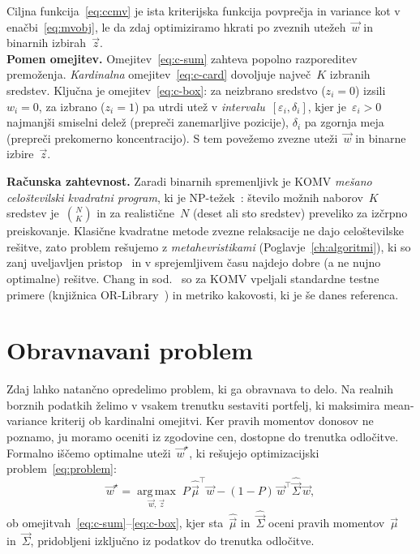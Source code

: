 \noindent Ciljna funkcija~\eqref{eq:ccmv} je ista kriterijska funkcija povprečja in variance kot v enačbi~\eqref{eq:mvobj}, le da zdaj optimiziramo hkrati po zveznih utežeh~$\vec{w}$ in binarnih izbirah~$\vec{z}$.\\

\noindent\textbf{Pomen omejitev.} Omejitev~\eqref{eq:c-sum} zahteva popolno razporeditev premoženja. \emph{Kardinalna} omejitev~\eqref{eq:c-card} dovoljuje največ~$K$ izbranih sredstev. Ključna je omejitev~\eqref{eq:c-box}: za neizbrano sredstvo ($z_i=0$) izsili~$w_i=0$, za izbrano ($z_i=1$) pa utrdi utež v \emph{intervalu}~$[\varepsilon_i,\delta_i]$, kjer je~$\varepsilon_i>0$ najmanjši smiselni delež (prepreči zanemarljive pozicije), $\delta_i$ pa zgornja meja (prepreči prekomerno koncentracijo). S tem povežemo zvezne uteži~$\vec{w}$ in binarne izbire~$\vec{z}$.

\noindent\textbf{Računska zahtevnost.} Zaradi binarnih spremenljivk je KOMV \emph{mešano celoštevilski kvadratni program}, ki je NP-težek~\cite{chang2000}: število možnih naborov~$K$ sredstev je~$\binom{N}{K}$ in za realistične~$N$ (deset ali sto sredstev) preveliko za izčrpno preiskovanje. Klasične kvadratne metode zvezne relaksacije ne dajo celoštevilske rešitve, zato problem rešujemo z \emph{metahevristikami} (Poglavje~\ref{ch:algoritmi}), ki so zanj uveljavljen pristop~\cite{chang2000,cramaschyns2003,cura2009,woodside2011} in v sprejemljivem času najdejo dobre (a ne nujno optimalne) rešitve. Chang in sod.~\cite{chang2000} so za KOMV vpeljali standardne testne primere (knjižnica OR-Library~\cite{beasley1990}) in metriko kakovosti, ki je še danes referenca.

\newpage
\section{Obravnavani problem}
\label{sec:nasproblem}

Zdaj lahko natančno opredelimo problem, ki ga obravnava to delo. Na realnih borznih podatkih želimo v vsakem trenutku sestaviti portfelj, ki maksimira mean-variance kriterij ob kardinalni omejitvi. Ker pravih momentov donosov ne poznamo, ju moramo oceniti iz zgodovine cen, dostopne do trenutka odločitve.\\

\noindent Formalno iščemo optimalne uteži~$\vec{w}^{\star}$, ki rešujejo optimizacijski problem~\eqref{eq:problem}:
\begin{equation}
\label{eq:problem}
  \vec{w}^{\star} = \operatorname*{arg\,max}_{\vec{w},\,\vec{z}} \; P\,\hat{\vec{\mu}}^{\!\top}\vec{w} - (1-P)\,\vec{w}^{\!\top}\hat{\vec{\Sigma}}\,\vec{w},
\end{equation}
ob omejitvah~\eqref{eq:c-sum}--\eqref{eq:c-box}, kjer sta~$\hat{\vec{\mu}}$ in~$\hat{\vec{\Sigma}}$ oceni pravih momentov~$\vec{\mu}$ in~$\vec{\Sigma}$, pridobljeni izključno iz podatkov do trenutka odločitve.\\

